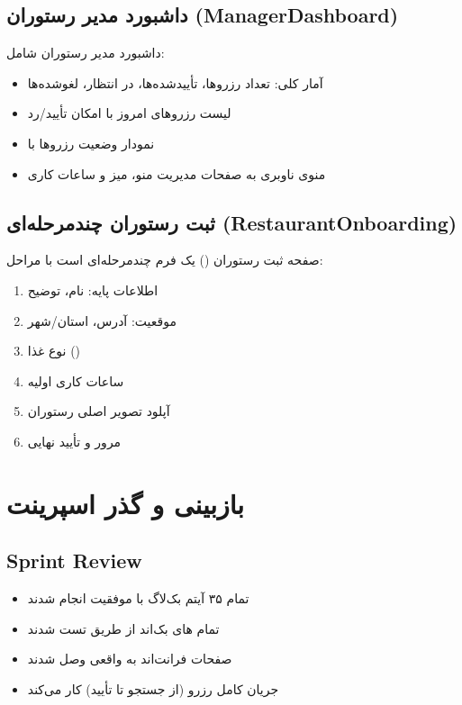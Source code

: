 \documentclass[12pt, a4paper]{article}
\begin{document}
\subsection{داشبورد مدیر رستوران (ManagerDashboard)}

داشبورد مدیر رستوران شامل:
\begin{itemize}[rightmargin=0.5cm]
  \item آمار کلی: تعداد رزروها، تأییدشده‌ها، در انتظار، لغوشده‌ها
  \item لیست رزروهای امروز با امکان تأیید/رد
  \item نمودار وضعیت رزروها با 
  \item منوی ناوبری به صفحات مدیریت منو، میز و ساعات کاری
\end{itemize}

\subsection{ثبت رستوران چندمرحله‌ای (RestaurantOnboarding)}

صفحه ثبت رستوران () یک فرم چندمرحله‌ای است با مراحل:
\begin{enumerate}[rightmargin=0.5cm]
  \item اطلاعات پایه: نام، توضیح
  \item موقعیت: آدرس، استان/شهر
  \item نوع غذا ()
  \item ساعات کاری اولیه
  \item آپلود تصویر اصلی رستوران
  \item مرور و تأیید نهایی
\end{enumerate}

\newpage

\section{بازبینی و گذر اسپرینت}

\subsection{Sprint Review}
\begin{itemize}[rightmargin=0.5cm]
  \item تمام ۳۵ آیتم بک‌لاگ با موفقیت انجام شدند
  \item تمام های بک‌اند از طریق  تست شدند
  \item صفحات فرانت‌اند به  واقعی وصل شدند
  \item جریان کامل رزرو (از جستجو تا تأیید) کار می‌کند
\end{itemize}
\end{document}
